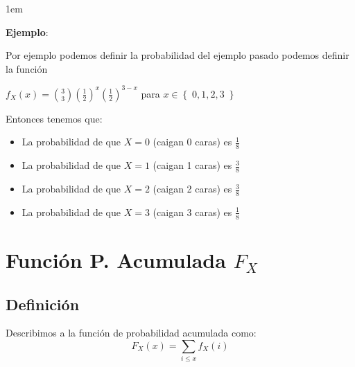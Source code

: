 \documentclass[12pt, fleqn]{report}                             %
\newenvironment{SmallIndentation}[1][0.75em]                    %
        {\begin{adjustwidth}{#1}{}\begin{footnotesize}}             %
        {\end{footnotesize}\end{adjustwidth}}                       %
\theoremstyle{break}                                            %
\newcommand{\Set}[1]{\left\{ \; #1 \; \right\}}                 %
\newcommand{\Wrap}[1]{\left( #1 \right)}                        %
\begin{document}
            \begin{SmallIndentation}[1em]
                \textbf{Ejemplo}:
                
                Por ejemplo podemos definir la probabilidad del ejemplo pasado
                podemos definir la función

                $f_{X}(x) = {3 \choose 3} \Wrap{\frac{1}{2}}^x \Wrap{\frac{1}{2}}^{3-x}$ 
                para $x \in \Set{0, 1, 2, 3}$

                Entonces tenemos que:
                \begin{itemize}
                    \item La probabilidad de que $X = 0$ (caigan 0 caras) es $\frac{1}{8}$ 
                    \item La probabilidad de que $X = 1$ (caigan 1 caras) es $\frac{3}{8}$ 
                    \item La probabilidad de que $X = 2$ (caigan 2 caras) es $\frac{3}{8}$ 
                    \item La probabilidad de que $X = 3$ (caigan 3 caras) es $\frac{1}{8}$ 
                \end{itemize}
            
            \end{SmallIndentation}


        \clearpage
        \section{Función P. Acumulada $F_X$}

            \subsection{Definición}

                Describimos a la función de probabilidad acumulada como:
                \begin{equation*}
                    F_X(x) = \sum_{i \leq x} f_{X}(i)
                \end{equation*}
\end{document}

